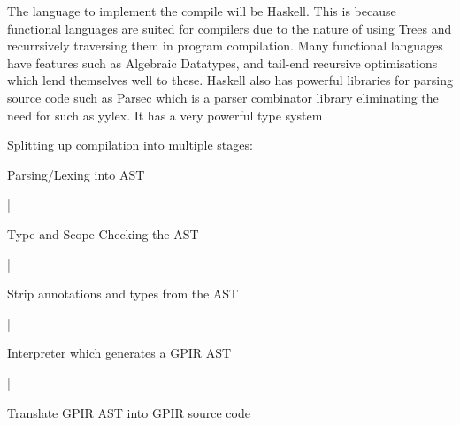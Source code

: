 The language to implement the compile will be Haskell.
This is because functional languages are suited for compilers due to the nature of using Trees and recurrsively 
traversing them in program compilation.
Many functional languages have features such as Algebraic Datatypes, and tail-end recursive optimisations
which lend themselves well to these.
Haskell also has powerful libraries for parsing source code such as Parsec which is a parser combinator
library eliminating the need for such as yylex. It has a very powerful type system

Splitting up compilation into multiple stages:
    
    Parsing/Lexing into AST

         |

     Type and Scope Checking the AST

         |

     Strip annotations and types from the AST

        |

     Interpreter which generates a GPIR AST

        |

      Translate GPIR AST into GPIR source code
